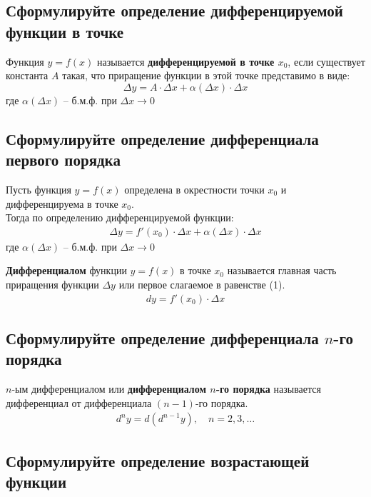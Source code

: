 \subsection{Сформулируйте определение дифференцируемой функции в точке}
\begin{definition}
Функция $y=f(x)$ называется \textbf{дифференцируемой в точке $x_0$}, если существует константа $A$ такая, что приращение функции в этой точке представимо в виде: \[ \boxed{\Delta y = A\cdot \Delta x + \alpha (\Delta x) \cdot \Delta x} \]
где $\alpha (\Delta x)$ -- б.м.ф. при $\Delta x \to 0$
\end{definition}
\newpage
\subsection{Сформулируйте определение дифференциала первого порядка}
Пусть функция $y=f(x)$ определена в окрестности точки $x_0$ и дифференцируема в точке $x_0$.\\
Тогда по определению дифференцируемой функции: \begin{align}
\Delta y = f'(x_0) \cdot \Delta x + \alpha (\Delta x) \cdot \Delta x
\end{align}
где $\alpha (\Delta x)$ -- б.м.ф. при $\Delta x \to 0$
\begin{definition}
\textbf{Дифференциалом} функции $y=f(x)$ в точке $x_0$ называется главная часть приращения функции $\Delta y$ или первое слагаемое в равенстве (1). 
\begin{align}
\boxed{dy = f'(x_0) \cdot \Delta x}
\end{align}
\end{definition}

\subsection{Сформулируйте определение дифференциала $n$-го порядка}
\begin{definition}
$n$-ым дифференциалом или \textbf{дифференциалом $n$-го порядка} называется дифференциал от дифференциала $(n-1)$-го порядка.
\begin{gather*}
d^ny = d(d^{n-1}y), \quad n=2,3,\ldots
\end{gather*} 
\end{definition}

\subsection{Сформулируйте определение возрастающей функции}
\begin{definition}

\end{definition}

